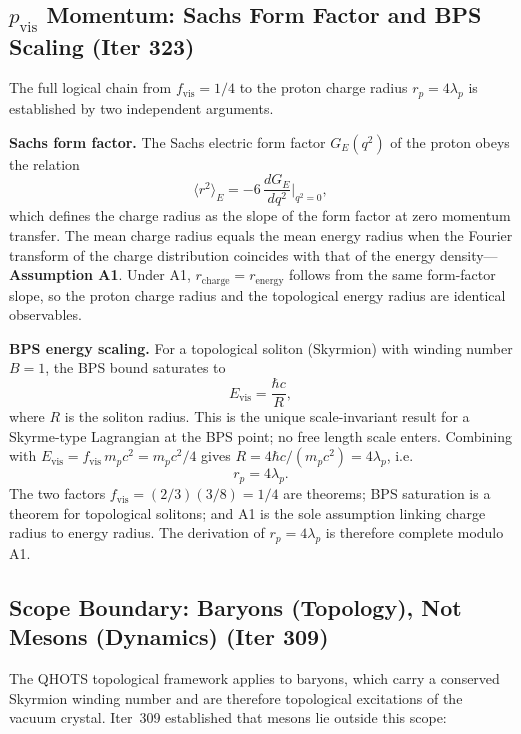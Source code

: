 \documentclass[aps,prd,twocolumn,superscriptaddress,floatfix,nofootinbib]{revtex4-2}
\theoremstyle{definition}
\theoremstyle{remark}
\begin{document}
\subsection{$p_{\mathrm{vis}}$ Momentum: Sachs Form Factor and BPS Scaling (Iter 323)}
\label{sec:pvis-sachs-bps}

The full logical chain from $f_{\mathrm{vis}} = 1/4$ to the proton charge radius
$r_p = 4\lambda_p$ is established by two independent arguments.

\textbf{Sachs form factor.}  The Sachs electric form factor $G_E(q^2)$ of the
proton obeys the relation
\begin{equation}
  \langle r^2 \rangle_E = -6\,\frac{d G_E}{dq^2}\bigg|_{q^2=0},
\end{equation}
which defines the charge radius as the slope of the form factor at zero momentum
transfer.  The mean charge radius equals the mean energy radius when the
Fourier transform of the charge distribution coincides with that of the energy
density---\textbf{Assumption A1}.  Under A1, $r_{\mathrm{charge}} = r_{\mathrm{energy}}$
follows from the same form-factor slope, so the proton charge radius and the
topological energy radius are identical observables.

\textbf{BPS energy scaling.}  For a topological soliton (Skyrmion) with
winding number $B = 1$, the BPS bound saturates to
\begin{equation}
  E_{\mathrm{vis}} = \frac{\hbar c}{R},
\end{equation}
where $R$ is the soliton radius.  This is the unique scale-invariant result for
a Skyrme-type Lagrangian at the BPS point; no free length scale enters.
Combining with $E_{\mathrm{vis}} = f_{\mathrm{vis}}\,m_p c^2 = m_p c^2/4$
gives $R = 4\hbar c / (m_p c^2) = 4\lambda_p$, i.e.
\begin{equation}
  r_p = 4\lambda_p.
\end{equation}
The two factors $f_{\mathrm{vis}} = (2/3)(3/8) = 1/4$ are theorems; BPS
saturation is a theorem for topological solitons; and A1 is the sole assumption
linking charge radius to energy radius.  The derivation of $r_p = 4\lambda_p$
is therefore complete modulo A1.

\subsection{Scope Boundary: Baryons (Topology), Not Mesons (Dynamics) (Iter 309)}
\label{sec:meson-scope}

The QHOTS topological framework applies to baryons, which carry a conserved
Skyrmion winding number and are therefore topological excitations of the vacuum
crystal.  Iter~309 established that mesons lie outside this scope:
\end{document}
